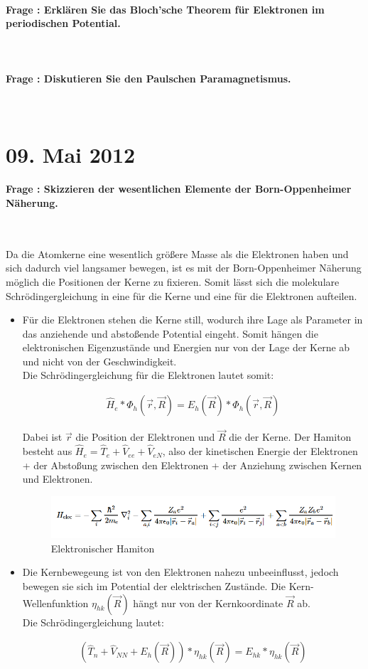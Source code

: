 \documentclass[a4paper, 11pt, ngerman, parskip=half-]{scrartcl}
\newcounter{question}
\newcommand{\question}[1]{\stepcounter{question}\paragraph{Frage \thequestion: #1}~}
\begin{document}
\question{Erklären Sie das Bloch'sche Theorem für Elektronen im periodischen Potential.}
\label{q:19}

\question{Diskutieren Sie den Paulschen Paramagnetismus.}
\label{q:20}
\newpage
\section{09. Mai 2012}

\question{Skizzieren der wesentlichen Elemente der Born-Oppenheimer Näherung.}
\label{q:21}

Da die Atomkerne eine wesentlich größere Masse als die Elektronen haben und sich dadurch viel langsamer bewegen, ist es mit der Born-Oppenheimer
Näherung möglich die Positionen der Kerne zu fixieren. Somit lässt sich die molekulare Schrödingergleichung in eine für die Kerne und eine
für die Elektronen aufteilen.

\begin{itemize}
    \item Für die Elektronen stehen die Kerne still, wodurch ihre Lage als Parameter in das anziehende und abstoßende Potential eingeht.
        Somit hängen die elektronischen Eigenzustände und Energien nur von der Lage der Kerne ab und nicht von der Geschwindigkeit.\\
            Die Schrödingergleichung für die Elektronen lautet somit:
            
        \begin{align}
            \hat{H}_e * \Phi_h(\vec{r},\vec{R}) = E_h(\vec{R}) *  \Phi_h(\vec{r},\vec{R})
        \end{align}

        Dabei ist $\vec{r}$ die Position der Elektronen und $\vec{R}$ die der Kerne. Der Hamiton besteht aus $\hat{H}_e = \hat{T}_e + \hat{V}_{ee} + \hat{V}_{eN}$, 
        also der kinetischen Energie der Elektronen + der Abstoßung zwischen den Elektronen + der Anziehung zwischen Kernen und Elektronen.

        \begin{figure}[H]
            \includegraphics[width=0.8\linewidth]{resources/09-05-2012/born_op.PNG}
            \caption{Elektronischer Hamiton}
        \end{figure}

    \item Die Kernbewegeung ist von den Elektronen nahezu unbeeinflusst, jedoch bewegen sie sich im Potential der elektrischen Zustände. 
        Die Kern-Wellenfunktion $\eta_{hk}(\vec{R})$ hängt nur von der Kernkoordinate $\vec{R}$ ab.\\
        Die Schrödingergleichung lautet: 

        \begin{align}
            (\hat{T}_n + \hat{V}_{NN} + E_h(\vec{R})) * \eta_{hk}(\vec{R}) = E_{hk} * \eta_{hk}(\vec{R})
        \end{align}
\end{itemize}
\end{document}
